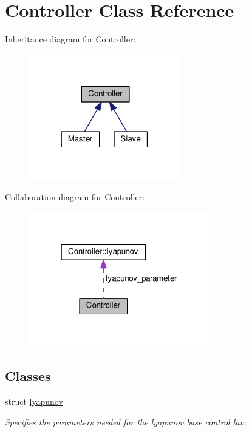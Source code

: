 \hypertarget{classController}{}\section{Controller Class Reference}
\label{classController}


Inheritance diagram for Controller\+:\nopagebreak
\begin{figure}[H]
\begin{center}
\leavevmode
\includegraphics[width=186pt]{classController__inherit__graph}
\end{center}
\end{figure}


Collaboration diagram for Controller\+:\nopagebreak
\begin{figure}[H]
\begin{center}
\leavevmode
\includegraphics[width=223pt]{classController__coll__graph}
\end{center}
\end{figure}
\subsection*{Classes}
\begin{DoxyCompactItemize}
\item 
struct \hyperlink{structController_1_1lyapunov}{lyapunov}
\begin{DoxyCompactList}\small\item\em Specifies the parameters needed for the lyapunov base control law. \end{DoxyCompactList}\end{DoxyCompactItemize}
